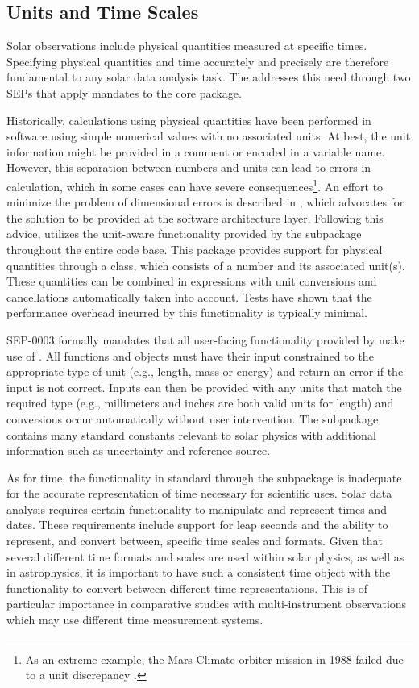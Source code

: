 \subsection{Units and Time Scales}
\label{sec:units}

Solar observations include physical quantities measured at specific times.
Specifying physical quantities and time accurately and precisely are therefore fundamental to any solar data analysis task.
The \sunpyproj addresses this need through two SEPs that apply mandates to the \sunpypkg core package.

Historically, calculations using physical quantities have been performed in software using simple numerical values with no associated units.
At best, the unit information might be provided in a comment or encoded in a variable name.
However, this separation between numbers and units can lead to errors in calculation, which in some cases can have severe consequences\footnote{As an extreme example, the Mars Climate orbiter mission in 1988 failed due to a unit discrepancy \citep{mco_mishap_report}.}.
An effort to minimize the problem of dimensional errors is described in \citet{Damevski2009}, which advocates for the solution to be provided at the software architecture layer.
Following this advice, \sunpypkg utilizes the unit-aware functionality provided by the  subpackage throughout the entire code base.
This package provides support for physical quantities through a  class, which consists of a number and its associated unit(s).
These quantities can be combined in expressions with unit conversions and cancellations automatically taken into account.
Tests have shown that the performance overhead incurred by this functionality is typically minimal.

SEP-0003 \citep{sep-0003} formally mandates that all user-facing functionality provided by \sunpypkg make use of .
All functions and objects must have their input constrained to the appropriate type of unit (e.g., length, mass or energy) and return an error if the input is not correct.
Inputs can then be provided with any units that match the required type (e.g., millimeters and inches are both valid units for length) and conversions occur automatically without user intervention.
The  subpackage contains many standard constants relevant to solar physics with additional information such as uncertainty and reference source.

As for time, the functionality in standard \python through the  subpackage is inadequate for the accurate representation of time necessary for scientific uses.
Solar data analysis requires certain functionality to manipulate and represent times and dates.
These requirements include support for leap seconds and the ability to represent, and convert between, specific time scales and formats.
Given that several different time formats and scales are used within solar physics, as well as in astrophysics, it is important to have such a consistent time object with the functionality to convert between different time representations.
This is of particular importance in comparative studies with multi-instrument observations which may use different time measurement systems.

